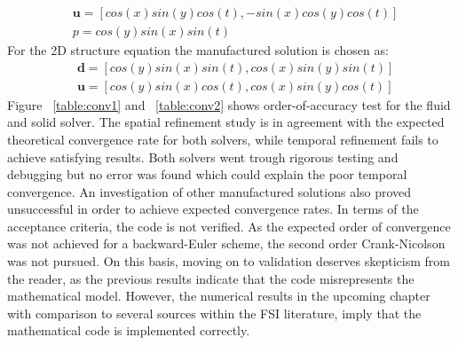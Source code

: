 \begin{align*}
&\mathbf{u} = [cos(x)sin(y)cos(t), -sin(x)cos(y)cos(t)] \\
&p = cos(y)sin(x)sin(t)
\end{align*}
For the 2D structure equation the manufactured solution is chosen as:
\begin{align*}
&\mathbf{d} = [cos(y)sin(x)sin(t), cos(x)sin(y)sin(t)] \\
&\mathbf{u} = [cos(y)sin(x)cos(t), cos(x)sin(y)cos(t)]
\end{align*}
Figure ~\ref{table:conv1} and ~\ref{table:conv2} shows order-of-accuracy test for the fluid and solid solver. The spatial refinement study is in agreement with the expected theoretical convergence rate for both solvers, while temporal refinement fails to achieve satisfying results. Both solvers went trough rigorous testing and debugging but no error was found which could explain the poor temporal convergence. An investigation of other manufactured solutions also proved unsuccessful in order to achieve expected convergence rates. In terms of the acceptance criteria, the code is not verified. As the expected order of convergence was not achieved for a backward-Euler scheme, the second order Crank-Nicolson was not pursued. On this basis, moving on to validation deserves skepticism from the reader, as the previous results indicate that the code misrepresents the mathematical model. However, the numerical results in the upcoming chapter with comparison to several sources within the FSI literature, imply that the mathematical code is implemented correctly. 
\newpage
